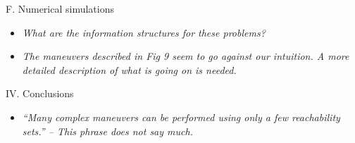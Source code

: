 \documentclass[submit]{aiaa-pretty}
\begin{document}
F. Numerical simulations
\begin{itemize}
\item \textit{What are the information structures for these problems?}
\item \textit{The maneuvers described in Fig 9 seem to go against our intuition. A more detailed description of what is going on is needed.}
\end{itemize}

IV. Conclusions
\begin{itemize}
\item \textit{``Many complex maneuvers can be performed using only a few reachability sets.'' – This phrase does not say much.}
\end{itemize}
\end{document}
